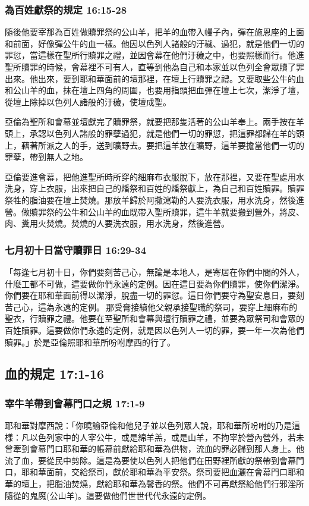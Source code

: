 \subsubsection{為百姓獻祭的規定 16:15-28}
隨後他要宰那為百姓做贖罪祭的公山羊，把羊的血帶入幔子內，彈在施恩座的上面和前面，好像彈公牛的血一樣。他因以色列人諸般的汙穢、過犯，就是他們一切的罪愆，當這樣在聖所行贖罪之禮，並因會幕在他們汙穢之中，也要照樣而行。他進聖所贖罪的時候，會幕裡不可有人，直等到他為自己和本家並以色列全會眾贖了罪出來。他出來，要到耶和華面前的壇那裡，在壇上行贖罪之禮。又要取些公牛的血和公山羊的血，抹在壇上四角的周圍，也要用指頭把血彈在壇上七次，潔淨了壇，從壇上除掉以色列人諸般的汙穢，使壇成聖。

亞倫為聖所和會幕並壇獻完了贖罪祭，就要把那隻活著的公山羊奉上。兩手按在羊頭上，承認以色列人諸般的罪孽過犯，就是他們一切的罪愆，把這罪都歸在羊的頭上，藉著所派之人的手，送到曠野去。要把這羊放在曠野，這羊要擔當他們一切的罪孽，帶到無人之地。

亞倫要進會幕，把他進聖所時所穿的細麻布衣服脫下，放在那裡，又要在聖處用水洗身，穿上衣服，出來把自己的燔祭和百姓的燔祭獻上，為自己和百姓贖罪。贖罪祭牲的脂油要在壇上焚燒。那放羊歸於阿撒瀉勒的人要洗衣服，用水洗身，然後進營。做贖罪祭的公牛和公山羊的血既帶入聖所贖罪，這牛羊就要搬到營外，將皮、肉、糞用火焚燒。焚燒的人要洗衣服，用水洗身，然後進營。

\subsubsection{七月初十日當守贖罪日 16:29-34}
「每逢七月初十日，你們要刻苦己心，無論是本地人，是寄居在你們中間的外人，什麼工都不可做，這要做你們永遠的定例。因在這日要為你們贖罪，使你們潔淨。你們要在耶和華面前得以潔淨，脫盡一切的罪愆。這日你們要守為聖安息日，要刻苦己心，這為永遠的定例。 那受膏接續他父親承接聖職的祭司，要穿上細麻布的聖衣，行贖罪之禮。他要在至聖所和會幕與壇行贖罪之禮，並要為眾祭司和會眾的百姓贖罪。這要做你們永遠的定例，就是因以色列人一切的罪，要一年一次為他們贖罪。」於是亞倫照耶和華所吩咐摩西的行了。

\subsection{血的規定 17:1-16}
\subsubsection{宰牛羊帶到會幕門口之規 17:1-9}
耶和華對摩西說：「你曉諭亞倫和他兒子並以色列眾人說，耶和華所吩咐的乃是這樣：凡以色列家中的人宰公牛，或是綿羊羔，或是山羊，不拘宰於營內營外，若未曾牽到會幕門口耶和華的帳幕前獻給耶和華為供物，流血的罪必歸到那人身上。他流了血，要從民中剪除。這是為要使以色列人把他們在田野裡所獻的祭帶到會幕門口，耶和華面前，交給祭司，獻於耶和華為平安祭。祭司要把血灑在會幕門口耶和華的壇上，把脂油焚燒，獻給耶和華為馨香的祭。他們不可再獻祭給他們行邪淫所隨從的鬼魔(公山羊)。這要做他們世世代代永遠的定例。


